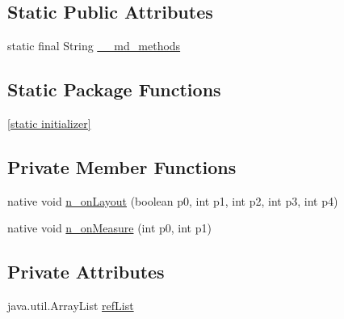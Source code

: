 \subsection*{Static Public Attributes}
\begin{CompactItemize}
\item 
static final String \hyperlink{classmd5b60ffeb829f638581ab2bb9b1a7f4f3f_1_1_native_view_wrapper_renderer_547a83f65da27218233c777a2e72959f}{\_\-\_\-md\_\-methods}
\end{CompactItemize}
\subsection*{Static Package Functions}
\begin{CompactItemize}
\item 
\hyperlink{classmd5b60ffeb829f638581ab2bb9b1a7f4f3f_1_1_native_view_wrapper_renderer_aef629feb8543853e610e97edec905ae}{\mbox{[}static initializer\mbox{]}}
\end{CompactItemize}
\subsection*{Private Member Functions}
\begin{CompactItemize}
\item 
native void \hyperlink{classmd5b60ffeb829f638581ab2bb9b1a7f4f3f_1_1_native_view_wrapper_renderer_7b65d0e1278ae3edf756f1f5dccf72fa}{n\_\-onLayout} (boolean p0, int p1, int p2, int p3, int p4)
\item 
native void \hyperlink{classmd5b60ffeb829f638581ab2bb9b1a7f4f3f_1_1_native_view_wrapper_renderer_582105ea43f5d7c863c98a959b8c698c}{n\_\-onMeasure} (int p0, int p1)
\end{CompactItemize}
\subsection*{Private Attributes}
\begin{CompactItemize}
\item 
java.util.ArrayList \hyperlink{classmd5b60ffeb829f638581ab2bb9b1a7f4f3f_1_1_native_view_wrapper_renderer_5e5809773a320b8a5d5e350c994525af}{refList}
\end{CompactItemize}


